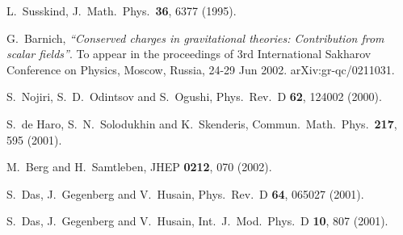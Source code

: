 \documentclass[a4paper,12pt]{article}
\begin{document}
\begin{thebibliography}{99}

  L.~Susskind, %
J.\ Math.\ Phys.\ \textbf{36}, 6377 (1995). 


  G.~Barnich, 
{\it ``Conserved charges in gravitational theories: Contribution from scalar  fields''}.
To appear in the proceedings of 3rd International Sakharov 
Conference on Physics, Moscow, Russia, 24-29 Jun 2002. 
arXiv:gr-qc/0211031. 


  S.~Nojiri, S.~D.~Odintsov and S.~Ogushi, 
Phys.\ Rev.\ D \textbf{62}, 124002 (2000). 

S.~de Haro, S.~N.~Solodukhin and K.~Skenderis,
Commun.\ Math.\ Phys.\  {\bf 217}, 595 (2001).

M.~Berg and H.~Samtleben,
JHEP {\bf 0212}, 070 (2002).


  S.~Das, J.~Gegenberg and V.~Husain, 
Phys.\ Rev.\ D \textbf{64}, 065027 (2001). 


  S.~Das, J.~Gegenberg and V.~Husain, 
Int.\ J.\ Mod.\ Phys.\ D \textbf{10}, 807 (2001). 
\end{thebibliography}
\end{document}
